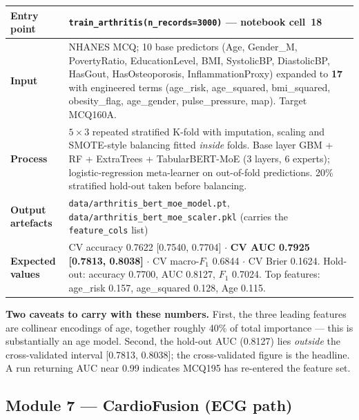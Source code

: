 \documentclass[11pt,a4paper]{article}
\newcommand{\code}[1]{\texttt{\small #1}}
\begin{document}
\begin{table}[!ht]
\centering
\small
\begin{tabular}{@{}p{2.4cm}p{12.4cm}@{}}
\toprule
\textbf{Entry point} & \code{train\_arthritis(n\_records=3000)} ---
notebook cell~18\\
\midrule
\textbf{Input} & NHANES MCQ; 10 base predictors (Age, Gender\_M,
PovertyRatio, EducationLevel, BMI, SystolicBP, DiastolicBP, HasGout,
HasOsteoporosis, InflammationProxy) expanded to \textbf{17} with
engineered terms (age\_risk, age\_squared, bmi\_squared, obesity\_flag,
age\_gender, pulse\_pressure, map). Target MCQ160A.\\
\addlinespace
\textbf{Process} & $5\times3$ repeated stratified K-fold with imputation,
scaling and SMOTE-style balancing fitted \emph{inside} folds. Base layer
GBM + RF + ExtraTrees + TabularBERT-MoE (3 layers, 6 experts);
logistic-regression meta-learner on out-of-fold predictions. 20\%
stratified hold-out taken before balancing.\\
\addlinespace
\textbf{Output artefacts} & \code{data/arthritis\_bert\_moe\_model.pt},
\code{data/arthritis\_bert\_moe\_scaler.pkl} (carries the
\code{feature\_cols} list)\\
\addlinespace
\textbf{Expected values} &
CV accuracy 0.7622 [0.7540, 0.7704] $\cdot$ \textbf{CV AUC 0.7925
[0.7813, 0.8038]} $\cdot$ CV macro-$F_1$ 0.6844 $\cdot$ CV Brier 0.1624.
Hold-out: accuracy 0.7700, AUC 0.8127, $F_1$ 0.7024. Top features:
age\_risk 0.157, age\_squared 0.128, Age 0.115.\\
\bottomrule
\end{tabular}
\end{table}

\noindent
\textbf{Two caveats to carry with these numbers.} First, the three leading
features are collinear encodings of age, together roughly 40\% of total
importance --- this is substantially an age model. Second, the hold-out AUC
(0.8127) lies \emph{outside} the cross-validated interval
[0.7813, 0.8038]; the cross-validated figure is the headline. A run
returning AUC near 0.99 indicates MCQ195 has re-entered the feature set.

\subsection{Module 7 --- CardioFusion (ECG path)}
\end{document}
